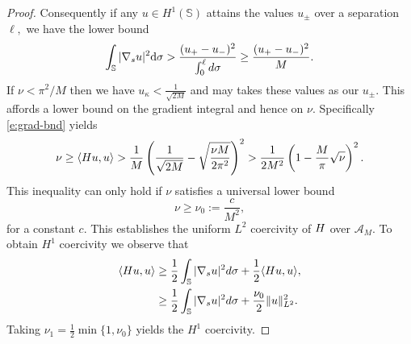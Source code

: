 \documentclass[10pt,a4paper]{amsart}
\def\cA{{\mathcal A}}
\def\mbbS{\mathbb{S}}
\def\mrH{\textrm H}
\def\mrd{\textrm d}
\def\rmd{\mathrm d}
\newcommand{\beq}{\begin{equation}}
\newcommand{\eeq}{\end{equation}}
\begin{document}
\begin{proof}
Consequently if any $u\in H^1(\mbbS)$ attains the values $u_\pm$ over a separation $\ell,$ we have the lower bound
\beq\label{e:grad-bnd}
\int_\mbbS |\nabla_s u|^2\rmd \sigma >\frac{(u_+-u_-)^2}{\int_0^\ell \mrd\sigma}\geq \frac{(u_+-u_-)^2}{M}.
\eeq
If $\nu< \pi^2/M$ then we have  $u_\kappa<\frac{1}{\sqrt{2M}}$ and may takes these values as our $u_\pm$. This affords a lower bound on the gradient integral and hence on $\nu$. Specifically \eqref{e:grad-bnd} yields
$$ \nu \geq \langle \mrH u, u\rangle > \frac{1}{M} \left(\frac{1}{\sqrt{2M}}-\sqrt{\frac{\nu M}{2\pi^2}}\right)^2> \frac{1}{2M^2}\left(1-\frac{M}{\pi}\sqrt{\nu}\right)^2.$$
This inequality can only hold if $\nu$ satisfies a universal lower bound 
\beq\label{e:nu0-def}\nu\geq\nu_0:= \frac{c}{M^2},
\eeq
for a constant $c.$ This  establishes the uniform $L^2$ coercivity of $\mrH$ over $\cA_M$. To obtain $H^1$ coercivity we observe
that 
$$\begin{aligned}
    \langle \mrH u, u\rangle &\geq \frac 12 \int_\mbbS |\nabla_s u|^2\mrd\sigma+ \frac12\langle\mrH u, u\rangle,\\ 
    &\geq \frac12\int_\mbbS |\nabla_s u|^2\mrd\sigma+   \frac {\nu_0}{2} \|u\|_{L^2}^2.
    \end{aligned} 
 $$
 Taking $\nu_1=\frac12 \min\{1,\nu_0\}$ 
 yields the $H^1$ coercivity.
\end{proof}
\end{document}
